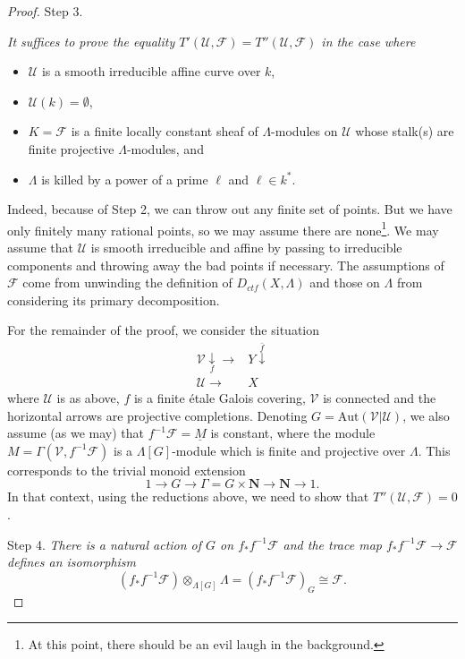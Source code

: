 \begin{proof}
\medskip\noindent
Step 3. {\it It suffices to prove the equality
$T'(\mathcal{U}, \mathcal{F}) = T''(\mathcal{U}, \mathcal{F})$
in the case where
\begin{itemize}
\item $\mathcal{U}$ is a smooth irreducible affine curve over $k$,
\item $\mathcal{U}(k) = \emptyset$,
\item $K=\mathcal{F}$ is a finite locally constant sheaf of $\Lambda$-modules
on $\mathcal{U}$ whose stalk(s) are finite projective $\Lambda$-modules, and
\item $\Lambda$ is killed by a power of a prime $\ell$ and $\ell \in k^*$.
\end{itemize}
}

\medskip\noindent
Indeed, because of Step 2, we can throw out any finite set of points. But we
have only finitely many rational points, so we may assume there are
none\footnote{At this point, there should be an evil laugh in the background.}.
We may assume that $\mathcal{U}$ is smooth irreducible and affine by passing to
irreducible components and throwing away the bad points if necessary. The
assumptions of $\mathcal{F}$ come from unwinding the definition of
$D_{ctf}(X, \Lambda)$ and those on $\Lambda$ from considering its primary
decomposition.

\medskip\noindent
For the remainder of the proof, we consider the situation
$$
\begin{array}{cc}\mathcal{V} \underset{f}{\downarrow}\longrightarrow & Y \overset{\bar f}{\downarrow} \\ \mathcal{U} \longrightarrow & X\end{array}
$$
where $\mathcal{U}$ is as above, $f$ is a finite \'etale Galois covering,
$\mathcal{V}$ is connected and the horizontal arrows are projective
completions. Denoting $G=\text{Aut}(\mathcal{V}|\mathcal{U})$, we also assume
(as we may) that $f^{-1}\mathcal{F} =\underline M$ is constant, where the
module $M = \Gamma(\mathcal{V}, f^{-1}\mathcal{F})$ is a $\Lambda[G]$-module
which is finite and projective over $\Lambda$. This corresponds to the trivial
monoid extension
$$
1\to G\to \Gamma = G \times \mathbf{N}\to \mathbf{N}\to 1.
$$
In that context, using the reductions above, we need to show that
$T''(\mathcal{U}, \mathcal{F}) = 0$.

\medskip\noindent
Step 4. {\it There is a natural action of $G$ on $f_*f^{-1}\mathcal{F}$ and
the trace map $f_*f^{-1}\mathcal{F}\to \mathcal{F}$ defines an isomorphism}
$$
(f_*f^{-1}\mathcal{F})\otimes_{\Lambda[G]} \Lambda =
(f_*f^{-1}\mathcal{F})_G \cong \mathcal{F}.
$$


\end{proof}
